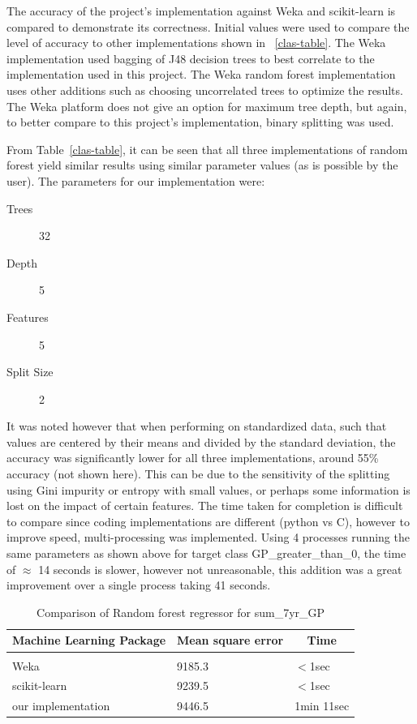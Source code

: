 \documentclass{article} %
\begin{document}
The accuracy of the project’s implementation against Weka and scikit-learn is compared to demonstrate
its correctness.  Initial values were used to compare the level of accuracy to other implementations shown in ~\ref{clas-table}. The Weka implementation used bagging of J48 decision trees to best correlate to the implementation used in this project. The Weka random forest implementation uses other additions such as choosing uncorrelated trees to optimize the results. The Weka platform does not give an option for maximum tree depth, but again, to better compare to this project's implementation, binary splitting was used.

From Table~\ref{clas-table}, it can be seen that all three implementations of random forest yield similar results using similar parameter values (as is possible by the user). The parameters for our implementation were:
\begin{description}
\item [Trees] 32
\item [Depth] 5
\item [Features] 5
\item [Split Size] 2
\end{description}

It was noted however that when performing on standardized data, such that values are centered by their means and divided by the standard deviation, the accuracy was significantly lower for all three implementations, around 55\% accuracy (not shown here). This can be due to the sensitivity of the splitting using Gini impurity or entropy with small values, or perhaps some information is lost on the impact of certain features. The time taken for completion is difficult to compare since coding implementations are different (python vs C), however to improve speed, multi-processing was implemented. Using 4 processes running the same parameters as shown above for target class GP\_greater\_than\_0, the time of $\approx$ 14 seconds is slower, however not unreasonable, this addition was a great improvement over a single process taking 41 seconds.

\begin{table}[h]
\caption{Comparison of Random forest regressor for sum\_7yr\_GP}
\label{reg-table}
\begin{center}
\begin{tabular}{lll}
\multicolumn{1}{c}{\bf Machine Learning Package} &\multicolumn{1}{c}{\bf Mean square error} &\multicolumn{1}{c}{\bf Time}
\\ \hline \\
Weka         &9185.3	&$<$1sec \\
scikit-learn             &9239.5	&$<$1sec \\
our implementation             &9446.5	&1min 11sec \\
\end{tabular}
\end{center}
\end{table}
\end{document}
